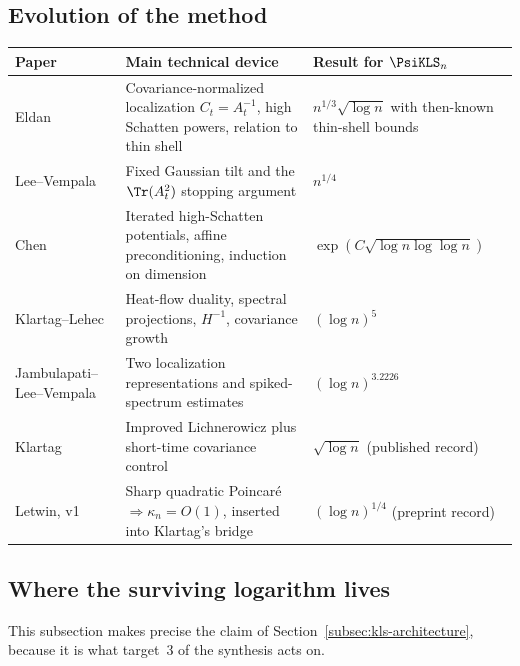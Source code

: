 \documentclass[../../main.tex]{subfiles}
\begin{document}
\subsection{Evolution of the method}
\label{subsec:sl-evolution}

\begin{center}
\begin{tabularx}{\textwidth}{@{}>{\raggedright\arraybackslash}p{}Y>{\raggedright\arraybackslash}p{0.24\textwidth}@{}}
\toprule
Paper & Main technical device & Result for $\PsiKLS_n$ \\
\midrule
Eldan \cite{Eldan2013ThinShell} & Covariance-normalized localization $C_t=A_t^{-1}$, high Schatten
powers, relation to thin shell & $n^{1/3}\sqrt{\log n}$ with then-known thin-shell bounds \\
\addlinespace
Lee--Vempala \cite{LeeVempala2018,LeeVempala2024} & Fixed Gaussian tilt and the $\Tr(A_t^2)$
stopping argument & $n^{1/4}$ \\
\addlinespace
Chen \cite{Chen2021} & Iterated high-Schatten potentials, affine preconditioning, induction on
dimension & $\exp(C\sqrt{\log n\log\log n})$ \\
\addlinespace
Klartag--Lehec \cite{KlartagLehec2022Polylog} & Heat-flow duality, spectral projections, $H^{-1}$,
covariance growth & $(\log n)^5$ \\
\addlinespace
Jambulapati--Lee--Vempala \cite{JambulapatiLeeVempala2022KLS} & Two localization representations
and spiked-spectrum estimates & $(\log n)^{3.2226}$ \\
\addlinespace
Klartag \cite{Klartag2023Logarithmic} & Improved Lichnerowicz plus short-time covariance control &
$\sqrt{\log n}$ (published record) \\
\addlinespace
Letwin, v1 \cite{Letwin2026QuadraticKLS} & Sharp quadratic Poincar\'e $\Rightarrow\kappa_n=O(1)$,
inserted into Klartag's bridge & $(\log n)^{1/4}$ (preprint record) \\
\bottomrule
\end{tabularx}
\end{center}

\subsection{Where the surviving logarithm lives}
\label{subsec:sl-where-the-log-lives}

This subsection makes precise the claim of Section~\ref{subsec:kls-architecture}, because it is
what target~3 of the synthesis acts on.
\end{document}
